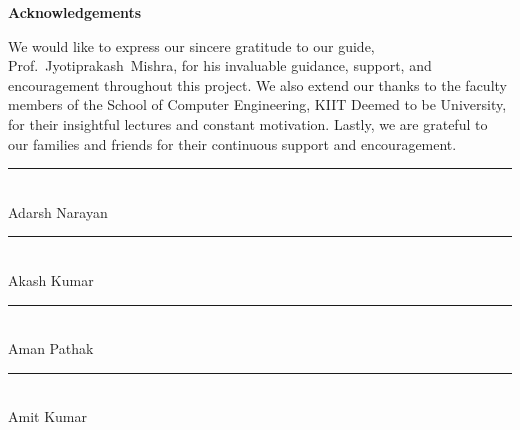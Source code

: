 \newpage
\begin{center}
	\Large \textbf{Acknowledgements}
\end{center}
\vspace{1cm}

\noindent
We would like to express our sincere gratitude to our guide, Prof.~Jyotiprakash~Mishra, for his invaluable guidance, support, and encouragement throughout this project. We also extend our thanks to the faculty members of the School of Computer Engineering, KIIT Deemed to be University, for their insightful lectures and constant motivation. Lastly, we are grateful to our families and friends for their continuous support and encouragement.

\vspace{2cm}

\vspace{1cm}

\noindent
\rule{6cm}{0.4pt} \\ 
Adarsh Narayan \\[1cm]

\noindent
\rule{6cm}{0.4pt} \\ 
Akash Kumar \\[1cm]

\noindent
\rule{6cm}{0.4pt} \\ 
Aman Pathak \\[1cm]

\noindent
\rule{6cm}{0.4pt} \\ 
Amit Kumar
